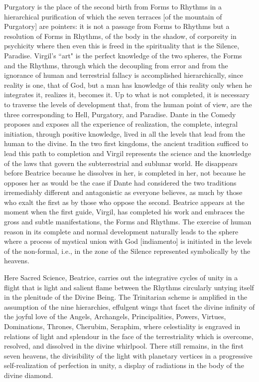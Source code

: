Purgatory is the place of the second birth from Forms to Rhythms in a hierarchical purification of which the seven terraces [of the mountain of Purgatory] are pointers: it is not a passage from Forms to Rhythms but a resolution of Forms in Rhythms, of the body in the shadow, of corporeity in psychicity where then even this is freed in the spirituality that is the Silence, Paradise. Virgil's ``art" is the perfect knowledge of the two spheres, the Forms and the Rhythms, through which the decoupling from error and from the ignorance of human and terrestrial fallacy is accomplished hierarchically, since reality is one, that of God, but a man has knowledge of this reality only when he integrates it, realizes it, becomes it. Up to what is not completed, it is necessary to traverse the levels of development that, from the human point of view, are the three corresponding to Hell, Purgatory, and Paradise. Dante in the Comedy proposes and exposes all the experience of realization, the complete, integral initiation, through positive knowledge, lived in all the levels that lead from the human to the divine. In the two first kingdoms, the ancient tradition sufficed to lead this path to completion and Virgil represents the science and the knowledge of the laws that govern the subterrestrial and sublunar world. He disappears before Beatrice because he dissolves in her, is completed in her, not because he opposes her as would be the case if Dante had considered the two traditions irremediably different and antagonistic as everyone believes, as much by those who exalt the first as by those who oppose the second. Beatrice appears at the moment when the first guide, Virgil, has completed his work and embraces the gross and subtle manifestations, the Forms and Rhythms. The exercise of human reason in its complete and normal development naturally leads to the sphere where a process of mystical union with God [indiamento] is initiated in the levels of the non-formal, i.e., in the zone of the Silence represented symbolically by the heavens.

Here Sacred Science, Beatrice, carries out the integrative cycles of unity in a flight that is light and salient flame between the Rhythms circularly untying itself in the plenitude of the Divine Being. The Trinitarian scheme is amplified in the assumption of the nine hierarchies, effulgent wings that facet the divine infinity of the joyful love of the Angels, Archangels, Principalities, Powers, Virtues, Dominations, Thrones, Cherubim, Seraphim, where celestiality is engraved in relations of light and splendour in the face of the terrestriality which is overcome, resolved, and dissolved in the divine whirlpool. There still remains, in the first seven heavens, the divisibility of the light with planetary vertices in a progressive self-realization of perfection in unity, a display of radiations in the body of the divine diamond.

